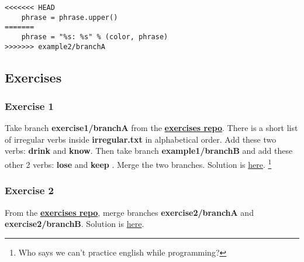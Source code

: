 \begin{lstlisting}[style=python_style, firstnumber=11, caption={\bf example 2} - inverted conflict]
<<<<<<< HEAD
    phrase = phrase.upper()
=======
    phrase = "%s: %s" % (color, phrase)
>>>>>>> example2/branchA
\end{lstlisting}

\subsection{Exercises}
\subsubsection{Exercise 1}
Take branch {\bf exercise1/branchA } from the \hyperref[exercises_repo]{\bf exercises repo}. There is a short list of
irregular verbs inside {\bf irregular.txt} in alphabetical order. Add these two verbs: {\bf drink} and {\bf know}. Then
take branch {\bf example1/branchB } and add these other 2 verbs: {\bf lose } and {\bf keep }. Merge the two branches. Solution
is \hyperref[exercise_01]{here}. \footnote{ Who says we can't practice english while programming? }

\subsubsection{Exercise 2}
From the \hyperref[exercises_repo]{\bf exercises repo}, merge branches {\bf exercise2/branchA} and {\bf exercise2/branchB}.
Solution is \hyperref[exercise_02]{here}.

